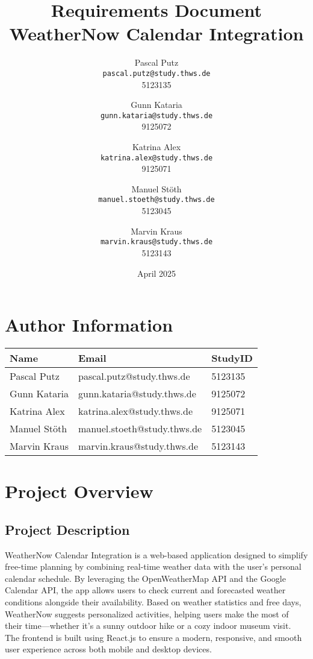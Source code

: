 \documentclass[12pt,a4paper]{article}
\title{Requirements Document\\\large WeatherNow Calendar Integration}
\author{
  Pascal Putz \\ \texttt{pascal.putz@study.thws.de} \\ 5123135
  \and
  Gunn Kataria \\ \texttt{gunn.kataria@study.thws.de} \\ 9125072
  \and
  Katrina Alex \\ \texttt{katrina.alex@study.thws.de} \\ 9125071
  \and
  Manuel Stöth \\ \texttt{manuel.stoeth@study.thws.de} \\ 5123045
  \and
  Marvin Kraus \\ \texttt{marvin.kraus@study.thws.de} \\ 5123143
  \and
}
\date{April 2025}
\begin{document}
\maketitle

\section{Author Information}
\begin{longtable}{|p{5cm}|p{6cm}|p{3cm}|}
\hline
\textbf{Name} & \textbf{Email} & \textbf{StudyID} \\
\hline
Pascal Putz & pascal.putz@study.thws.de & 5123135 \\
\hline
Gunn Kataria & gunn.kataria@study.thws.de & 9125072 \\
\hline
Katrina Alex & katrina.alex@study.thws.de & 9125071 \\
\hline
Manuel Stöth & manuel.stoeth@study.thws.de & 5123045 \\
\hline
Marvin Kraus & marvin.kraus@study.thws.de & 5123143 \\
\hline
\end{longtable}

\newpage

\section{Project Overview}

\subsection{Project Description}
WeatherNow Calendar Integration is a web-based application designed to simplify free-time planning by combining real-time weather data with the user’s personal calendar schedule. By leveraging the OpenWeatherMap API and the Google Calendar API, the app allows users to check current and forecasted weather conditions alongside their availability. Based on weather statistics and free days, WeatherNow suggests personalized activities, helping users make the most of their time—whether it’s a sunny outdoor hike or a cozy indoor museum visit. The frontend is built using React.js to ensure a modern, responsive, and smooth user experience across both mobile and desktop devices.
\end{document}
